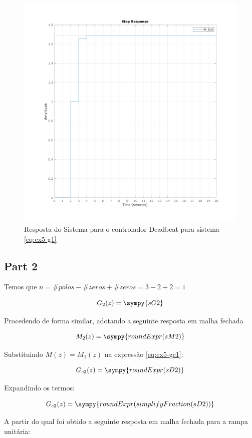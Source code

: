 \documentclass[a4paper,11pt]{article}
\begin{document}
\begin{figure}[H]
    \centering
    \includegraphics[width=0.6\linewidth]{img/exsim5-g1-deadbeat-sim.png}
    \caption{Resposta do Sistema para o controlador Deadbeat para sistema \ref{eq:ex5-g1}}
\end{figure}

\subsection{Part 2}

Temos que $n = \#polos - \#zeros + \#zeros = 3  - 2 + 2 = 1$

\begin{equation}\label{eq:ex5-g2}
    G_2(z) = \sympy{sG2}
\end{equation}

Procedendo de forma similar, adotando a seguinte resposta em malha fechada

$$
M_2(z) = \sympy{roundExpr(sM2)}
$$

Substituindo $M(z) = M_1(z)$ na expressão \ref{eq:ex5-gc1}:

$$G_{c2}(z) = \sympy{roundExpr(sD2)}$$

Expandindo os termos:

$$G_{c2}(z) = \sympy{roundExpr(simplifyFraction(sD2))}$$

A partir do qual foi obtido a seguinte resposta em malha fechada para a rampa unitária:
\end{document}
